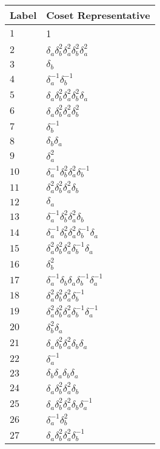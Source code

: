 \documentclass{article}
\begin{document}
\begin{center}
\begin{tabular}{ll}
\toprule
Label & Coset Representative\\
\midrule
$1$ & 1 \\
$2$ & $\delta_a^{}\delta_b^{2}\delta_a^{2}\delta_b^{2}\delta_a^{2}$ \\
$3$ & $\delta_b^{}$ \\
$4$ & $\delta_a^{-1}\delta_b^{-1}$ \\
$5$ & $\delta_a^{}\delta_b^{2}\delta_a^{2}\delta_b^{2}\delta_a^{}$ \\
$6$ & $\delta_a^{}\delta_b^{2}\delta_a^{2}\delta_b^{2}$ \\
$7$ & $\delta_b^{-1}$ \\
$8$ & $\delta_b^{}\delta_a^{}$ \\
$9$ & $\delta_a^{2}$ \\
$10$ & $\delta_a^{-1}\delta_b^{2}\delta_a^{2}\delta_b^{-1}$ \\
$11$ & $\delta_a^{2}\delta_b^{2}\delta_a^{2}\delta_b^{}$ \\
$12$ & $\delta_a^{}$ \\
$13$ & $\delta_a^{-1}\delta_b^{2}\delta_a^{2}\delta_b^{}$ \\
$14$ & $\delta_a^{-1}\delta_b^{2}\delta_a^{2}\delta_b^{-1}\delta_a^{}$ \\
$15$ & $\delta_a^{2}\delta_b^{2}\delta_a^{2}\delta_b^{-1}\delta_a^{}$ \\
$16$ & $\delta_b^{2}$ \\
$17$ & $\delta_a^{-1}\delta_b^{}\delta_a^{}\delta_b^{-1}\delta_a^{-1}$ \\
$18$ & $\delta_a^{2}\delta_b^{2}\delta_a^{2}\delta_b^{-1}$ \\
$19$ & $\delta_a^{2}\delta_b^{2}\delta_a^{2}\delta_b^{-1}\delta_a^{-1}$ \\
$20$ & $\delta_b^{2}\delta_a^{}$ \\
$21$ & $\delta_a^{}\delta_b^{2}\delta_a^{2}\delta_b^{}\delta_a^{}$ \\
$22$ & $\delta_a^{-1}$ \\
$23$ & $\delta_b^{}\delta_a^{}\delta_b^{}\delta_a^{}$ \\
$24$ & $\delta_a^{}\delta_b^{2}\delta_a^{2}\delta_b^{}$ \\
$25$ & $\delta_a^{}\delta_b^{2}\delta_a^{2}\delta_b^{}\delta_a^{-1}$ \\
$26$ & $\delta_a^{-1}\delta_b^{2}$ \\
$27$ & $\delta_a^{}\delta_b^{2}\delta_a^{2}\delta_b^{-1}$ \\

\end{tabular}
\end{center}
\end{document}
